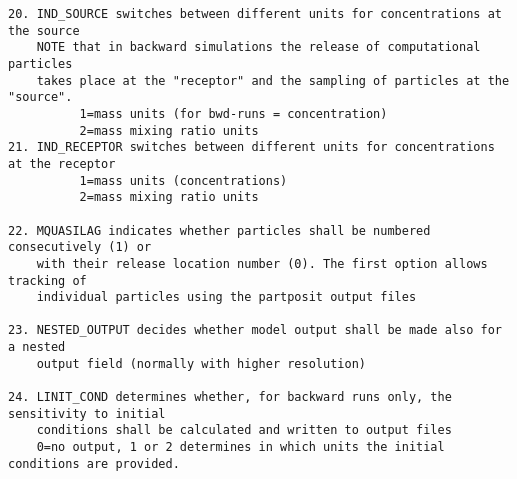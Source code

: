 \documentclass{egu}            %
\begin{document}
\begin{scriptsize}
\begin{verbatim}
20. IND_SOURCE switches between different units for concentrations at the source
    NOTE that in backward simulations the release of computational particles
    takes place at the "receptor" and the sampling of particles at the "source".
          1=mass units (for bwd-runs = concentration)
          2=mass mixing ratio units
21. IND_RECEPTOR switches between different units for concentrations at the receptor
          1=mass units (concentrations)
          2=mass mixing ratio units

22. MQUASILAG indicates whether particles shall be numbered consecutively (1) or
    with their release location number (0). The first option allows tracking of
    individual particles using the partposit output files

23. NESTED_OUTPUT decides whether model output shall be made also for a nested
    output field (normally with higher resolution)

24. LINIT_COND determines whether, for backward runs only, the sensitivity to initial
    conditions shall be calculated and written to output files
    0=no output, 1 or 2 determines in which units the initial conditions are provided.

\end{verbatim}\end{scriptsize}

\newpage
\end{document}
